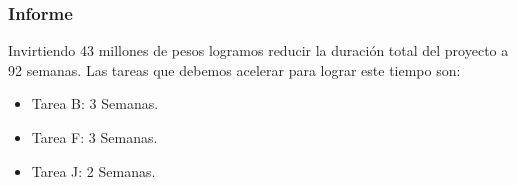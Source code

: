 \begin{homeworkProblem}
\subsubsection{Informe}
Invirtiendo 43 millones de pesos logramos reducir la duración total del proyecto a 92 semanas. Las tareas que debemos acelerar para lograr este tiempo son:
\begin{itemize}
    \item Tarea B: 3 Semanas.
    \item Tarea F: 3 Semanas.
    \item Tarea J: 2 Semanas.
\end{itemize}

\end{homeworkProblem}